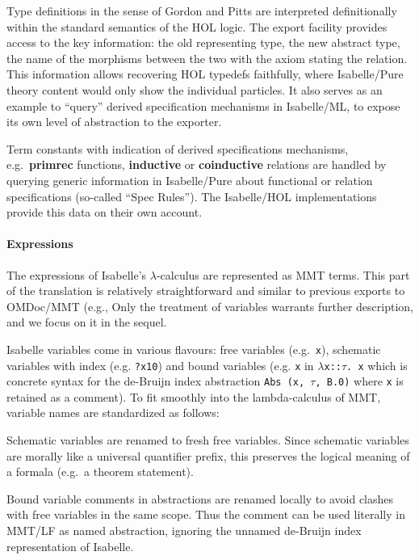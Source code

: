 Type definitions in the sense of Gordon and
  Pitts \cite{pitts93} are interpreted
  definitionally within the standard semantics of the HOL
  logic. The export facility provides access to the key
  information: the old representing type, the new abstract type, the
  name of the morphisms between the two with the axiom stating the
  relation.
  This information allows recovering HOL typedefs faithfully, where
  Isabelle/Pure theory content would only show the individual
  particles. It also serves as an example to ``query'' derived
  specification mechanisms in Isabelle/ML, to expose its own level of
  abstraction to the exporter.
  
Term constants with indication of derived specifications
  mechanisms, e.g.\ \textbf{primrec} functions, \textbf{inductive} or
  \textbf{coinductive} relations are handled by querying generic
  information in Isabelle/Pure about functional or relation
  specifications (so-called ``Spec Rules''). The Isabelle/HOL
  implementations provide this data on their own account.

\paragraph{Expressions}
The expressions of Isabelle's $\lambda$-calculus are represented as MMT terms.
This part of the translation is relatively straightforward and similar to previous exports to OMDoc/MMT (e.g., 
Only the treatment of variables warrants further description, and we focus on it in the sequel.

Isabelle variables come in various flavours: free variables (e.g.\
\verb,x,), schematic variables with index (e.g. \verb,?x10,) and bound
variables (e.g. \verb,x, in $\lambda$\verb,x::,$\tau$\verb,. x, which
is concrete syntax for the de-Bruijn index abstraction
\verb;Abs (x, ;$\tau$\verb;, B.0); where \verb,x, is retained as a
comment). To fit smoothly into the lambda-calculus of MMT, variable
names are standardized as follows:

Schematic variables are renamed to fresh free variables. Since
  schematic variables are morally like a universal quantifier prefix,
  this preserves the logical meaning of a formala (e.g.\ a theorem
  statement).

Bound variable comments in abstractions are renamed locally to
  avoid clashes with free variables in the same scope. Thus the
  comment can be used literally in MMT/LF as named abstraction,
  ignoring the unnamed de-Bruijn index representation of Isabelle.


